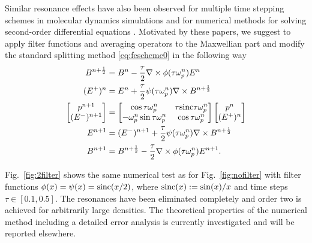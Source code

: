 \documentclass[conference]{IEEEtran}
\newcommand{\np}{n+\frac{1}{2}}
\newcommand{\sinc}{\textnormal{sinc}}
\newcommand{\nt}{\nabla\times}
\newcommand{\cwpnt}{\cos\tau\omega^n_p}
\newcommand{\swpnt}{\sin\tau\omega^n_p}
\newcommand{\scwpnt}{\sinc\tau\omega^n_p}
\renewcommand{\~}{\widetilde }
\begin{document}
Similar resonance effects have also been observed for multiple time stepping schemes in
molecular dynamics simulations \cite{BieS93} and for numerical methods for solving
second-order differential equations \cite{GarSS98,HocL99,GriH06}. 
Motivated by these papers, we suggest to apply filter functions and
averaging operators to the Maxwellian part and modify the standard splitting
method \eqref{eq:fescheme0} in the following way
\begin{subequations}\label{eq:fescheme}
\begin{align}
 B^{\np}  &= B^n - \frac{\tau}{2}\nt\phi(\tau\omega_p^n) E^n 	  \label{eq:feschemea}\\
(E^+)^n   &= E^n + \frac{\tau}{2}\psi(\tau\omega_p^n)\nt B^{\np}    
\label{eq:feschemeb}\\
\begin{bmatrix} p^{n+1}\\(E^-)^{n+1}\end{bmatrix} &= \begin{bmatrix} \cwpnt & \tau\scwpnt\\-\omega_p^n\swpnt & \cwpnt\end{bmatrix}\begin{bmatrix} p^n\\(E^+)^n\end{bmatrix}\label{eq:feschemec}\\
E^{n+1} &= (E^-)^{n+1} + \frac{\tau}{2}\psi(\tau\omega_p^n)\nt
B^{\np}\label{eq:feschemed}\\
B^{n+1} &= B^{\np} - \frac{\tau}{2}\nt\phi(\tau\omega_p^n) E^{n+1}  
\label{eq:feschemee}.
\end{align}
\end{subequations}

Fig.~\ref{fig:2filter} shows the same numerical test as for Fig.~\ref{fig:nofilter} with
filter functions $\phi(x)=\psi(x)=\sinc({x}/{2})$, where $\sinc(x):=\sin(x)/x$ and time
steps $\tau \in[0.1,0.5]$. 
The resonances have been eliminated completely and order two is achieved for arbitrarily
large densities. The theoretical properties of the numerical method including a detailed
error analysis is currently investigated and will be reported elsewhere.
\end{document}
